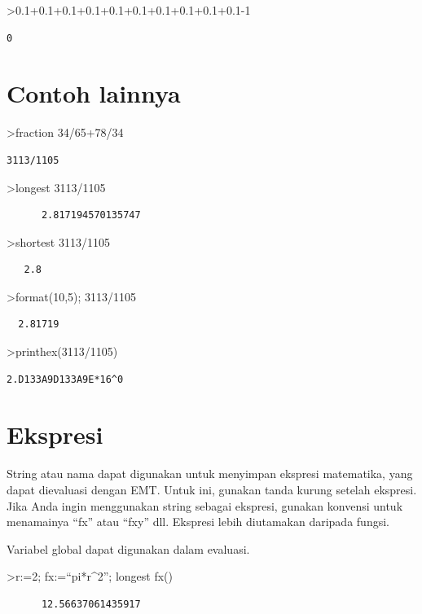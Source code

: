 \documentclass[
]{book}
\begin{document}
\textgreater0.1+0.1+0.1+0.1+0.1+0.1+0.1+0.1+0.1+0.1-1

\begin{verbatim}
0
\end{verbatim}

\chapter{Contoh lainnya}\label{contoh-lainnya-5}

\textgreater fraction 34/65+78/34

\begin{verbatim}
3113/1105
\end{verbatim}

\textgreater longest 3113/1105

\begin{verbatim}
      2.817194570135747 
\end{verbatim}

\textgreater shortest 3113/1105

\begin{verbatim}
   2.8 
\end{verbatim}

\textgreater format(10,5); 3113/1105

\begin{verbatim}
  2.81719 
\end{verbatim}

\textgreater printhex(3113/1105)

\begin{verbatim}
2.D133A9D133A9E*16^0
\end{verbatim}

\chapter{Ekspresi}\label{ekspresi}

String atau nama dapat digunakan untuk menyimpan ekspresi matematika, yang dapat dievaluasi dengan EMT. Untuk ini, gunakan tanda kurung setelah ekspresi. Jika Anda ingin menggunakan string sebagai ekspresi, gunakan konvensi untuk menamainya ``fx'' atau ``fxy'' dll. Ekspresi lebih diutamakan daripada fungsi.

Variabel global dapat digunakan dalam evaluasi.

\textgreater r:=2; fx:=``pi*r\^{}2''; longest fx()

\begin{verbatim}
      12.56637061435917 
\end{verbatim}
\end{document}
